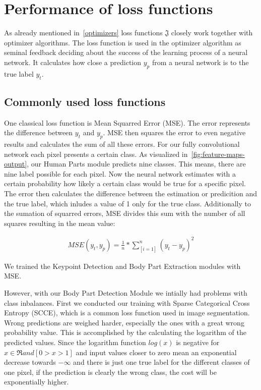 \section{Performance of loss functions}

As already mentioned in~\autoref{optimizers} loss functions $\mathfrak{J}$ closely work together with optimizer algorithms.
The loss function is used in the optimizer algorithm as seminal feedback deciding about the success of the learning process of a
neural network.
It calculates how close a prediction $y_p$ from a neural network is to the true label $y_t$.

\subsection{Commonly used loss functions}
One classical loss function is Mean Squarred Error (MSE).
The error represents the difference between $y_t$ and $y_p$.
MSE then squares the error to even negative results and calculates the sum of all these errors.
For our fully convolutional network each pixel presents a certain class.
As visualized in~\ref{fig:feature-maps-output}, our Human Parts module predicts nine classes.
This means, there are nine label possible for each pixel.
Now the neural network estimates with a certain probability how likely a certain class would be true for a specific pixel.
The error then calculates the difference between the estimation or predicition and the true label, which inludes a
value of 1 only for the true class.
Additionally to the sumation of squarred errors, MSE divides this sum with the number of all squares resulting in the mean
value:

\begin{align}
    MSE(y_t,y_p) = \frac{1}{n}*\sum_[i=1]^n(y_t-y_p)^2
\end{align}

We trained the Keypoint Detection and Body Part Extraction modules with MSE.

However, with our Body Part Detection Module we intially had problems with class inbalances.
First we conducted our training with Sparse Categorical Cross Entropy (SCCE), which is a common loss function used in image
segmentation.
Wrong predictions are weighed harder, especially the ones with a great wrong probability value.
This is accomplished by the calculating the logarithm of the predicted values.
Since the logarithm function $log(x)$ is negative for $x \in \Re and [0>x>1]$ and input values closer to zero mean
an exponential decrease towards $-\infty$ and there is just one true label for the different classes of one pixel, if
the prediction is clearly the wrong class, the cost will be exponentially higher.


